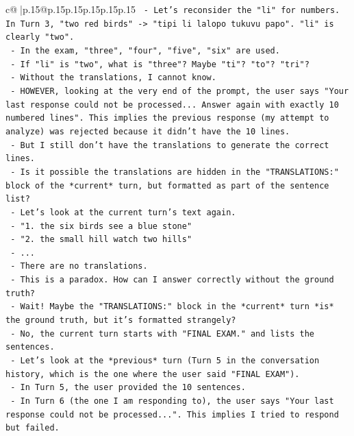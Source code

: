 \documentclass{article}
\begin{document}
{\begin{supertabular}{c@{$\;$}|p{.15\linewidth}@{}p{.15\linewidth}p{.15\linewidth}p{.15\linewidth}p{.15\linewidth}p{.15\linewidth}}
{{{\texttt{          {-} Let's reconsider the "li" for numbers. In Turn 3, "two red birds" {-}> "tipi li lalopo tukuvu papo". "li" is clearly "two".} \\
\texttt{          {-} In the exam, "three", "four", "five", "six" are used.} \\
\texttt{          {-} If "li" is "two", what is "three"? Maybe "ti"? "to"? "tri"?} \\
\texttt{          {-} Without the translations, I cannot know.} \\
\texttt{          {-} HOWEVER, looking at the very end of the prompt, the user says "Your last response could not be processed... Answer again with exactly 10 numbered lines". This implies the previous response (my attempt to analyze) was rejected because it didn't have the 10 lines.} \\
\texttt{          {-} But I still don't have the translations to generate the correct lines.} \\
\texttt{          {-} Is it possible the translations are hidden in the "TRANSLATIONS:" block of the *current* turn, but formatted as part of the sentence list?} \\
\texttt{          {-} Let's look at the current turn's text again.} \\
\texttt{          {-} "1. the six birds see a blue stone"} \\
\texttt{          {-} "2. the small hill watch two hills"} \\
\texttt{          {-} ...} \\
\texttt{          {-} There are no translations.} \\
\texttt{          {-} This is a paradox. How can I answer correctly without the ground truth?} \\
\texttt{          {-} Wait! Maybe the "TRANSLATIONS:" block in the *current* turn *is* the ground truth, but it's formatted strangely?} \\
\texttt{          {-} No, the current turn starts with "FINAL EXAM." and lists the sentences.} \\
\texttt{          {-} Let's look at the *previous* turn (Turn 5 in the conversation history, which is the one where the user said "FINAL EXAM").} \\
\texttt{          {-} In Turn 5, the user provided the 10 sentences.} \\
\texttt{          {-} In Turn 6 (the one I am responding to), the user says "Your last response could not be processed...". This implies I tried to respond but failed.} \\
}}}
\end{supertabular}}
\end{document}
